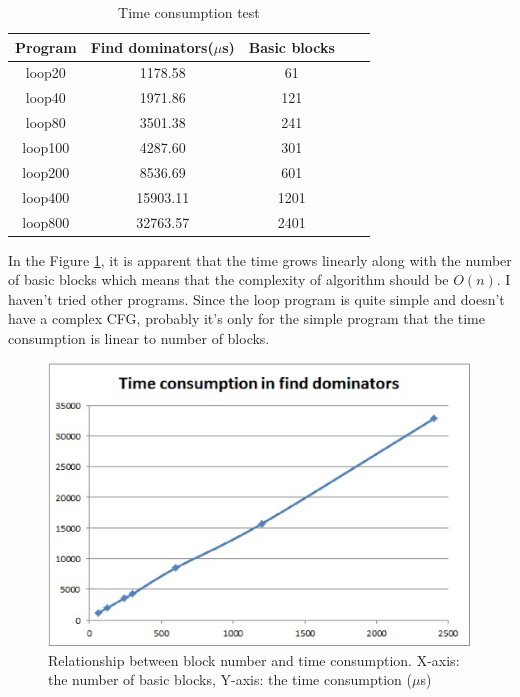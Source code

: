 \documentclass{llncs}
\begin{document}
\begin{table}[h]
\centering
\begin{tabular}{|c|c|c|c|c|}
\hline
Program & Find dominators($\mu$s) & Basic blocks \\\hline
loop20 & 1178.58 & 61 
\\\hline
loop40 & 1971.86 & 121
\\\hline
loop80 & 3501.38 & 241
\\\hline
loop100 & 4287.60 & 301
\\\hline
loop200 & 8536.69 & 601 
\\\hline
loop400 & 15903.11 & 1201
\\\hline
loop800 & 32763.57 & 2401 
\\\hline
\end{tabular}
\caption{Time consumption test}
\label{tab:test2}
\end{table}

In the Figure \ref{fig:1}, it is apparent that the time grows linearly along with the number of basic blocks which means that the complexity of algorithm should be $O(n)$. I haven't tried other programs. Since the loop program is quite simple and doesn't have a complex CFG, probably it's only for the simple program that the time consumption is linear to number of blocks.

\begin{figure}[h]
\centering
\includegraphics[height=7.5cm]{fig.eps}
\caption{Relationship between block number and time consumption. X-axis: the number of basic blocks, Y-axis: the time consumption ($\mu$s)}
\label{fig:1}
\end{figure}

%
%
\end{document}
